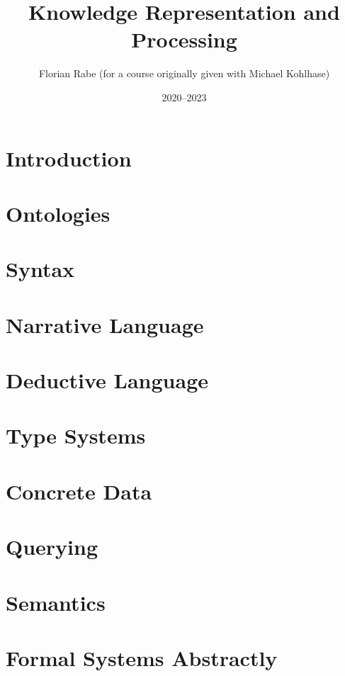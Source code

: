 \documentclass{beamer}
\begin{document}
\title{Knowledge Representation and Processing}
\author{Florian Rabe (for a course originally given with Michael Kohlhase)}
\date{2020--2023}
\begin{frame}
    \titlepage
\end{frame}

\part{Introduction}


\part{Ontologies}


\part{Syntax}


\part{Narrative Language}


\part{Deductive Language}


\part{Type Systems}


\part{Concrete Data}


\part{Querying}


\part{Semantics}


\part{Formal Systems Abstractly}

\end{document}
